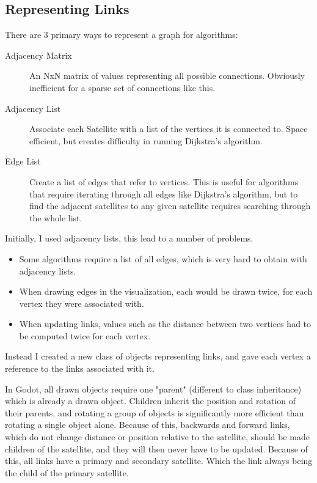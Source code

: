 \documentclass[12pt,a4paper,twoside,openright]{report}
\begin{document}
\subsection{Representing Links}
There are 3 primary ways to represent a graph for algorithms:

\begin{description}
\item[Adjacency Matrix] An NxN matrix of values representing all possible connections. Obviously inefficient for a sparse set of connections like this.
\item[Adjacency List] Associate each Satellite with a list of the vertices it is connected to. Space efficient, but creates difficulty in running Dijkstra's algorithm.
\item[Edge List] Create a list of edges that refer to vertices. This is useful for algorithms that require iterating through all edges like Dijkstra's algorithm, but to find the adjacent satellites to any given satellite requires searching through the whole list.
\end{description}

Initially, I used adjacency lists, this lead to a number of problems.

\begin{itemize}
\item Some algorithms require a list of all edges, which is very hard to obtain with adjacency lists.
\item When drawing edges in the visualization, each would be drawn twice, for each vertex they were associated with.
\item When updating links, values such as the distance between two vertices had to be computed twice for each vertex.
\end{itemize}

Instead I created a new class of objects representing links, and gave each vertex a reference to the links associated with it. 

In Godot, all drawn objects require one "parent" (different to class inheritance) which is already a drawn object. Children inherit the position and rotation of their parents, and rotating a group of objects is significantly more efficient than rotating a single object alone. Because of this, backwards and forward links, which do not change distance or position relative to the satellite, should be made children of the satellite, and they will then never have to be updated. Because of this, all links have a primary and secondary satellite. Which the link always being the child of the primary satellite.
\end{document}
